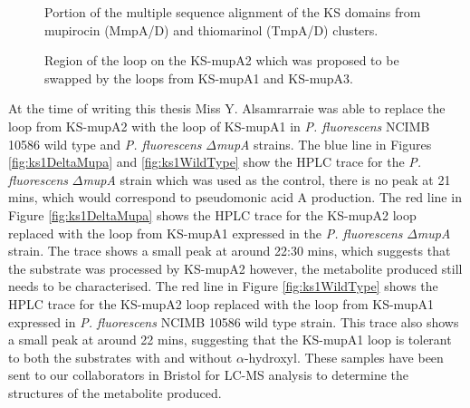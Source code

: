 		\setlength\fboxsep{5pt}
		\setlength\fboxrule{1.5pt}
		\begin{figure}[htbp]
		\centering
		\caption[Portion of the multiple sequence alignment of the KS domains from mupirocin (MmpA/D) and thiomarinol (TmpA/D) clusters. ]{Portion of the multiple sequence alignment of the KS domains from mupirocin (MmpA/D) and thiomarinol (TmpA/D) clusters.}
		\label{fig:ks_alignment}
		\end{figure}	

		\setlength\fboxsep{5pt}
		\setlength\fboxrule{1.5pt}
		\begin{figure}[htbp]
		\centering
		\caption[Region of the loop on the KS-mupA2 which was proposed to be swapped by the loops from KS-mupA1 and KS-mupA3. ]{Region of the loop on the KS-mupA2 which was proposed to be swapped by the loops from KS-mupA1 and KS-mupA3.}
		\label{fig:loopswap}
		\end{figure}	
%		
		At the time of writing this thesis Miss Y. Alsamrarraie was able to replace the loop from KS-mupA2 with the loop of KS-mupA1 in \textit{P. fluorescens} NCIMB 10586 wild type and \textit{P. fluorescens} $\Delta$\textit{mupA} strains. The blue line in Figures \ref{fig:ks1DeltaMupa} and \ref{fig:ks1WildType} show the HPLC trace for the \textit{P. fluorescens} $\Delta$\textit{mupA} strain which was used as the control, there is no peak at 21 mins, which would correspond to pseudomonic acid A production. The red line in Figure \ref{fig:ks1DeltaMupa} shows the HPLC trace for the KS-mupA2 loop replaced with the loop from KS-mupA1 expressed in the \textit{P. fluorescens} $\Delta$\textit{mupA} strain. The trace shows a small peak at around 22:30 mins, which suggests that the substrate was processed by KS-mupA2 however, the metabolite produced still needs to be characterised. The red line in Figure \ref{fig:ks1WildType} shows the HPLC trace for the KS-mupA2 loop replaced with the loop from KS-mupA1 expressed in \textit{P. fluorescens} NCIMB 10586 wild type strain. This trace also shows a small peak at around 22 mins, suggesting that the KS-mupA1 loop is tolerant to both the substrates with and without $ \alpha $-hydroxyl. These samples have been sent to our collaborators in Bristol for LC-MS analysis to determine the structures of the metabolite produced. 


